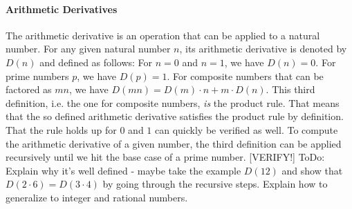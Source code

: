\paragraph{Arithmetic Derivatives} The arithmetic derivative is an operation that can be applied to a natural number. For any given natural number $n$, its arithmetic derivative is denoted by $D(n)$ and defined as follows: For $n=0$ and $n=1$, we have $D(n) = 0$. For prime numbers $p$, we have $D(p) = 1$. For composite numbers that can be factored as $m n$, we have $D(m n) = D(m) \cdot n + m \cdot D(n)$. This third definition, i.e. the one for composite numbers, \emph{is} the product rule. That means that the so defined arithmetic derivative satisfies the product rule by definition. That the rule holds up for $0$ and $1$ can quickly be verified as well. To compute the arithmetic derivative of a given number, the third definition can be applied recursively until we hit the base case of a prime number. [VERIFY!] ToDo: Explain why it's well defined - maybe take the example $D(12)$ and show that $D(2 \cdot 6) = D(3 \cdot 4)$ by going through the recursive steps. Explain how to generalize to integer and rational numbers.


